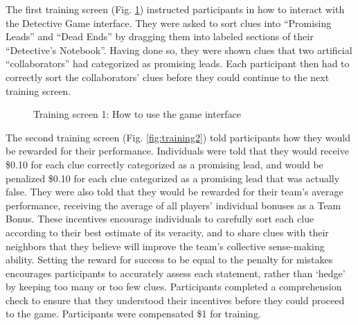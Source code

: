 \documentclass{article}
\begin{document}
The first training screen (Fig. \ref{fig:training1}) instructed participants in how to interact with the Detective Game interface. They were asked to sort clues into ``Promising Leads'' and ``Dead Ends'' by dragging them into labeled sections of their ``Detective’s Notebook''. Having done so, they were shown clues that two artificial ``collaborators'' had categorized as promising leads. Each participant then had to correctly sort the collaborators' clues before they could continue to the next training screen.

\begin{figure}[h!]
\centering
{}
\caption{Training screen 1: How to use the game interface}
\label{fig:training1}
\end{figure}

The second training screen (Fig. \ref{fig:training2}) told participants how they would be rewarded for their performance. Individuals were told that they would receive \$0.10 for each clue correctly categorized as a promising lead, and would be penalized \$0.10 for each clue categorized as a promising lead that was actually false. They were also told that they would be rewarded for their team’s average performance, receiving the average of all players’ individual bonuses as a Team Bonus. These incentives encourage individuals to carefully sort each clue according to their best estimate of its veracity, and to share clues with their neighbors that they believe will improve the team’s collective sense-making ability. Setting the reward for success to be equal to the penalty for mistakes encourages participants to accurately assess each statement, rather than ‘hedge’ by keeping too many or too few clues. Participants completed a comprehension check to ensure that they understood their incentives before they could proceed to the game. Participants were compensated \$1 for training.
\end{document}
